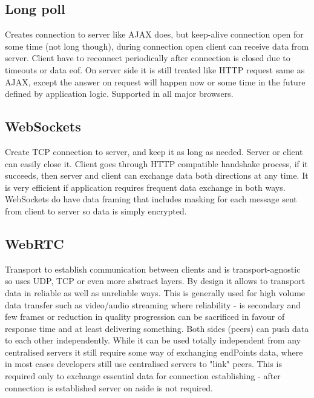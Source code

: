 



\subsection{Long poll}
Creates connection to server like AJAX does, but keep-alive connection open for some time (not long though), during connection open client can receive data from server. Client have to reconnect periodically after connection is closed due to timeouts or data eof. On server side it is still treated like HTTP request same as AJAX, except the answer on request will happen now or some time in the future defined by application logic. Supported in all major browsers.


\subsection{WebSockets}

Create TCP connection to server, and keep it as long as needed. Server or client can easily close it. Client goes through HTTP compatible handshake process, if it succeeds, then server and client can exchange data both directions at any time. It is very efficient if application requires frequent data exchange in both ways. WebSockets do have data framing that includes masking for each message sent from client to server so data is simply encrypted. 


\subsection{WebRTC}

Transport to establish communication between clients and is transport-agnostic so uses UDP, TCP or even more abstract layers. By design it allows to transport data in reliable as well as unreliable ways. This is generally used for high volume data transfer such as video/audio streaming where reliability - is secondary and few frames or reduction in quality progression can be sacrificed in favour of response time and at least delivering something. Both sides (peers) can push data to each other independently. While it can be used totally independent from any centralised servers it still require some way of exchanging endPoints data, where in most cases developers still use centralised servers to "link" peers. This is required only to exchange essential data for connection establishing - after connection is established server on aside is not required.


